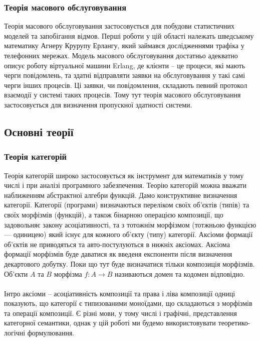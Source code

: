 \documentclass[11pt,oneside]{article}
\begin{document}
   \subsubsection{Теорія масового обслуговування}
   Теорія масового обслуговування застосовується для побудови
   статистичних моделей та запобігання відмов. Перші роботи у цій області
   належать шведському математику Агнеру Крурупу Ерлангу, який займався
   дослідженнями трафіка у телефонних мережах. Модель масового обслуговування достатньо
   адекватно описує роботу віртуальної машини Erlang, де клієнти -- це процеси,
   які мають черги повідомлень, та здатні відправляти заявки на обслуговування
   у такі самі черги інших процесів. Ці заявки, чи повідомлення, складають певний
   протокол взаємодії у системі таких процесів. Тому тут теорія масового обслуговування
   застосовується для визначення пропускної здатності системи.

\newpage
\subsection{Основні теорії}
\vspace{0.3cm}

   \subsubsection{Теорія категорій}
   Теорія категорій широко застосовується як інструмент для математиків у тому числі і
   при аналізі програмного забезпечення. Теорію категорій можна вважати наближенням абстрактної алгебри функцій.
   Дамо конструктивне визначення категорії.
   Категорії (програми) визначаються переліком своїх об’єктів (типів) та своїх
   морфізмів (функцій), а також бінарною операцією композиції,
   що задовольняє закону асоціативності, та з тотожнім морфізмом (тотжньою функцією --- одиницею) який існує
   для кожного об’єкту (типу) категорії. Аксіоми формації об’єктів не
   приводяться та авто-постулуються в нижніх аксіомах. Аксіома формації
   морфізмів буде даватися як введеня експоненти після визначення декартового добутку.
   Поки що тут буде визначатися тільки композиція морфізмів. Об’єкти $A$ та $B$ морфізма $f: A \rightarrow B$
   називаються домен та кодомен відповідно.

   \paragraph{}
   Інтро аксіоми -- асоціативність композиції та права і ліва композиції одниці показують,
   що категорії є типизованими моноїдами, що складаються з морфізмів та операції композиції.
   Є різні мови, у тому числі і графічні, представлення категорної семантики, однак у цій роботі
   ми будемо використовувати теоретико-логічні формулювання.
\end{document}
